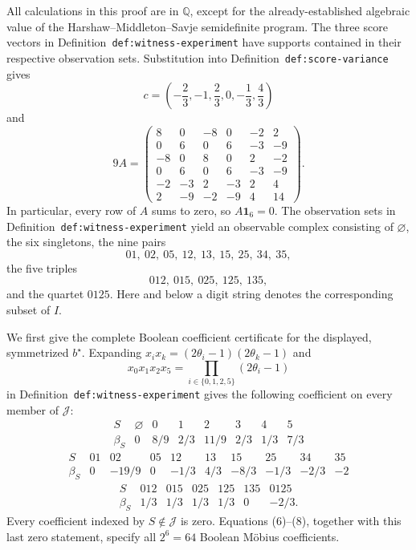 All calculations in this proof are in \(\mathbb Q\), except for the already-established algebraic value of the Harshaw--Middleton--Savje semidefinite program.  The three score vectors in Definition~\texttt{def:witness-experiment} have supports contained in their respective observation sets.  Substitution into Definition~\texttt{def:score-variance} gives
\[
c=\left(-\frac23,-1,\frac23,0,-\frac13,\frac43\right)
\tag{1}
\]
and
\[
9A=
\begin{pmatrix}
8&0&-8&0&-2&2\\
0&6&0&6&-3&-9\\
-8&0&8&0&2&-2\\
0&6&0&6&-3&-9\\
-2&-3&2&-3&2&4\\
2&-9&-2&-9&4&14
\end{pmatrix}.
\tag{2}
\]
In particular, every row of \(A\) sums to zero, so \(A\mathbf 1_6=0\).  The observation sets in Definition~\texttt{def:witness-experiment} yield an observable complex consisting of \(\varnothing\), the six singletons, the nine pairs
\[
01,\ 02,\ 05,\ 12,\ 13,\ 15,\ 25,\ 34,\ 35,
\tag{3}
\]
the five triples
\[
012,\ 015,\ 025,\ 125,\ 135,
\tag{4}
\]
and the quartet \(0125\).  Here and below a digit string denotes the corresponding subset of \(I\).

We first give the complete Boolean coefficient certificate for the displayed, symmetrized \(b^\star\).  Expanding \(x_i x_k=(2\theta_i-1)(2\theta_k-1)\) and
\[
x_0x_1x_2x_5=
\prod_{i\in\{0,1,2,5\}}(2\theta_i-1)
\tag{5}
\]
in Definition~\texttt{def:witness-experiment} gives the following coefficient on every member of \(\mathcal J\):
\[
\begin{array}{c|rrrrrrr}
S&\varnothing&0&1&2&3&4&5\\ \hline
\beta_S&0&8/9&2/3&11/9&2/3&1/3&7/3
\end{array}
\tag{6}
\]
\[
\begin{array}{c|rrrrrrrrr}
S&01&02&05&12&13&15&25&34&35\\ \hline
\beta_S&0&-19/9&0&-1/3&4/3&-8/3&-1/3&-2/3&-2
\end{array}
\tag{7}
\]
\[
\begin{array}{c|rrrrrr}
S&012&015&025&125&135&0125\\ \hline
\beta_S&1/3&1/3&1/3&1/3&0&-2/3.
\end{array}
\tag{8}
\]
Every coefficient indexed by \(S\notin\mathcal J\) is zero.  Equations (6)--(8), together with this last zero statement, specify all \(2^6=64\) Boolean Möbius coefficients.

